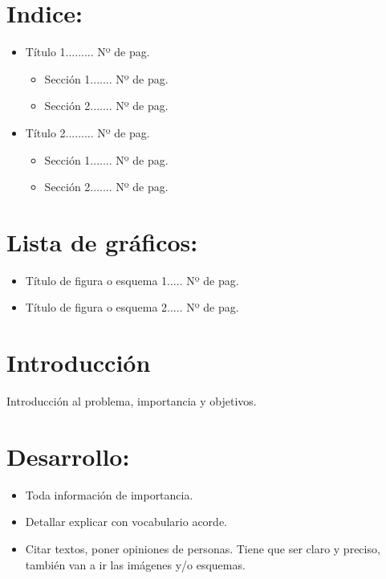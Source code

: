 \documentclass[12pt]{article}
\begin{document}
{{\begin{minipage}[c][\paperheight]{\paperwidth}
\section*{Indice:}

\begin{itemize}
	\item Título 1......... Nº de pag.
		\begin{itemize}
			\item Sección 1....... Nº de pag.
			\item Sección 2....... Nº de pag.
		\end{itemize}
	\item Título 2......... Nº de pag.
		\begin{itemize}
			\item Sección 1....... Nº de pag.
			\item Sección 2....... Nº de pag.
		\end{itemize}
\end{itemize}

\section*{Lista de gráficos:}

\begin{itemize}

	\item Título de figura o esquema 1..... Nº de pag.

	\item Título de figura o esquema 2..... Nº de pag.

\end{itemize}

\section*{Introducción}

Introducción al problema, importancia y objetivos.

\section*{Desarrollo:}
\begin{itemize}

	\item Toda información de importancia.

	\item Detallar explicar con vocabulario acorde. 

	\item Citar textos, poner opiniones de personas. Tiene que ser claro y
		preciso, también van a ir las imágenes y/o esquemas.


\end{itemize}
\end{minipage}}}
\end{document}
